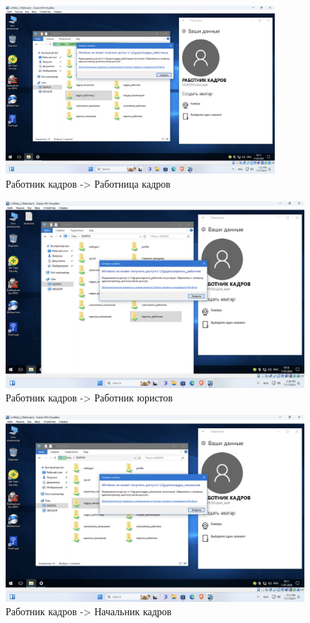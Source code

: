 \begin{figure}[H]
  \centering
  \includegraphics[width=0.9\textwidth]{pict/prac/26}
  \caption{Работник кадров -> Работница кадров}
  \label{fig:25}
\end{figure}


\begin{figure}[H]
  \centering
  \includegraphics[width=1\textwidth]{pict/prac/32}
  \caption{Работник кадров -> Работник юристов}
  \label{fig:31}
\end{figure}


\begin{figure}[H]
  \centering
  \includegraphics[width=1\textwidth]{pict/prac/27}
  \caption{Работник кадров -> Начальник кадров}
  \label{fig:26}
\end{figure}


